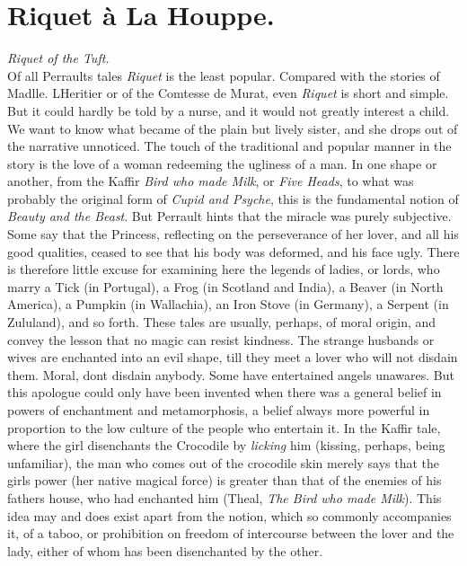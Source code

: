 \documentclass[14pt,a4paper]{memoir}
\newcommand{\notesection}[1]{%
  \addtonotes{\protect\par\protect\vspace{2ex}\protect\noindent\textbf{#1}\protect\par\protect\vspace{1ex}}%
}
\begin{document}
{\section{Riquet à La Houppe.}
\notesection{Riquet à La Houppe.}

\emph{Riquet of the Tuft.} \\

Of all Perrault\textquotesingle s tales \emph{Riquet} is the least
popular. Compared with the stories of Madlle. L\textquotesingle Heritier
or of the Comtesse de Murat, even \emph{Riquet} is short and simple. But
it could hardly be told by a nurse, and it would not greatly interest a
child. We want to know what became of the plain but lively sister, and
she drops out of the narrative unnoticed. The touch of the traditional
and popular manner in the story is the love of a woman redeeming the
ugliness of a man. In one shape or another, from the Kaffir \emph{Bird
who made Milk}, or \emph{Five Heads}, to what was probably the original
form of \emph{Cupid and Psyche}, this is the fundamental notion of
\emph{Beauty and the
Beast}.
But Perrault hints that the miracle was purely
\textquotesingle subjective.\textquotesingle{} \textquotesingle Some say
that the Princess, reflecting on the perseverance of her lover, and all
his good qualities, ceased to see that his body was deformed, and his
face ugly.\textquotesingle{} There is therefore little excuse for
examining here the legends of ladies, or lords, who marry a Tick (in
Portugal), a Frog (in Scotland and India), a Beaver (in North America),
a Pumpkin (in Wallachia), an Iron Stove (in Germany), a Serpent (in
Zululand), and so forth. These tales are usually, perhaps, of moral
origin, and convey the lesson that no magic can resist kindness. The
strange husbands or wives are enchanted into an evil shape, till they
meet a lover who will not disdain them. Moral, don\textquotesingle t
disdain anybody. Some have entertained angels unawares. But this
apologue could only have been invented when there was a general belief
in powers of enchantment and metamorphosis, a belief always more
powerful in proportion to the low culture of the people who entertain
it. In the Kaffir tale, where the girl disenchants the Crocodile by
\emph{licking} him (kissing, perhaps, being unfamiliar), the man who
comes out of the crocodile skin merely says that the
girl\textquotesingle s \textquotesingle power\textquotesingle{} (her
native magical force) is greater than that of \textquotesingle the
enemies of his father\textquotesingle s house,\textquotesingle{} who had
enchanted him (Theal, \emph{The Bird who made Milk}). This idea may and
does exist apart from the notion, which so commonly accompanies it, of a
taboo, or prohibition on freedom of intercourse between the lover and
the lady, either of whom has been disenchanted by the other.

}
\end{document}
